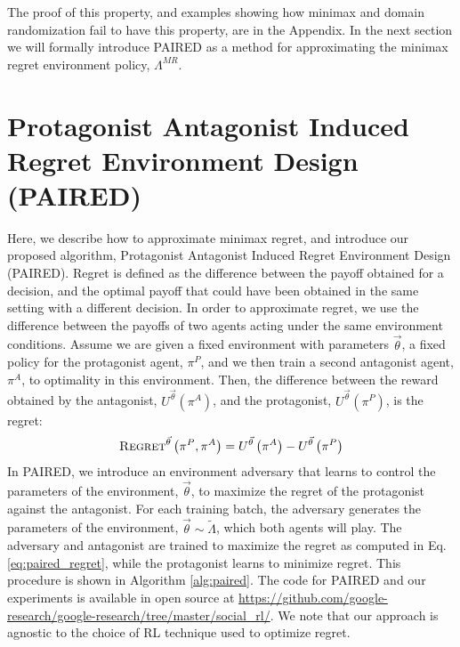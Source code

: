 \documentclass{article}
\begin{document}
The proof of this property, and examples showing how minimax and domain randomization fail to have this property, are in the Appendix. In the next section we will formally introduce PAIRED as a method for approximating the minimax regret environment policy, $\Lambda^{MR}$.



\section{Protagonist Antagonist Induced Regret Environment Design (PAIRED)}
\label{sec:paired} 
Here, we describe how to approximate minimax regret, and introduce our proposed algorithm, Protagonist Antagonist Induced Regret Environment Design (PAIRED).  Regret is defined as the difference between the payoff obtained for a decision, and the optimal payoff that could have been obtained in the same setting with a different decision. In order to approximate regret, we use the difference between the payoffs of two agents acting under the same environment conditions.  Assume we are given a fixed environment with parameters $\vec{\theta}$, a fixed policy for the protagonist agent, $\pi^P$, and we then train a second antagonist agent, $\pi^A$, to optimality in this environment. Then,
the difference between the reward obtained by the antagonist, $U^{\vec{\theta}}(\pi^A)$, and the protagonist, $U^{\vec{\theta}}(\pi^P)$, is the regret:
\begin{align}
    \normalfont\textsc{Regret}^{\vec{\theta}}\left(\pi^P, \pi^A\right) = U^{\vec{\theta}}\left(\pi^A\right) - U^{\vec{\theta}}\left(\pi^P\right)
    \label{eq:paired_regret}
\end{align}
In PAIRED, we introduce an environment adversary that learns to control the parameters of the environment, $\vec{\theta}$, to maximize the regret of the protagonist against the antagonist. 
For each training batch,
the adversary generates the parameters of the environment, $\vec{\theta} \sim \tilde{\Lambda}$, which both agents will play. The adversary and antagonist are trained to maximize the regret as computed in Eq. \ref{eq:paired_regret}, while the protagonist learns to minimize regret. This procedure is shown in Algorithm \ref{alg:paired}. The code for PAIRED and our experiments is available in open source at \url{https://github.com/google-research/google-research/tree/master/social_rl/}.
 We note that our approach is agnostic to the choice of RL technique used to optimize regret. 
\end{document}
